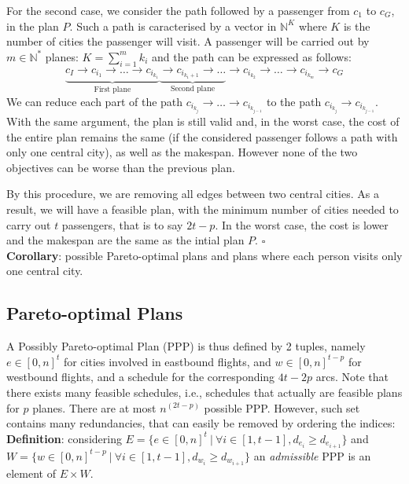 \documentclass{llncs}
\begin{document}
For the second case, we consider the path followed by a passenger from $c_1$ to $c_G$, in the plan $P$. Such a path is caracterised by a vector in $\mathbb{N}^{K}$ where $K$ is the number of cities the passenger will visit. A passenger will be carried out by $m \in \mathbb{N}^*$ planes: $K = \sum_{i=1}^m k_i$ and the path can be expressed as follows: 
$$\underbrace{c_I \to c_{i_{1}} \to \ldots \to c_{i_{k_1}}}_{\text{First plane}} \underbrace{\to c_{i_{k_1 + 1}} \to \ldots}_{\text{Second plane}} \to c_{i_{k_2}} \to \ldots \to c_{i_{k_m}} \to c_G$$
We can reduce each part of the path $c_{i_{k_j}} \to \ldots \to c_{i_{k_{j-1}}}$ to the path $c_{i_{k_j}} \to c_{i_{k_{j-1}}}$. With the same argument, the plan is still valid and, in the worst case, the cost of the entire plan remains the same (if the considered passenger follows a path with only one central city), as well as the makespan. However none of the two objectives can be worse than the previous plan.

By this procedure, we are removing all edges between two central cities. As a result, we will have a feasible plan, with the minimum number of cities needed to carry out $t$ passengers, that is to say $2t-p$. In the worst case, the cost is lower and the makespan are the same as the intial plan $P$. $\square$\\

\noindent
{\bf Corollary}: possible Pareto-optimal plans and plans where each person visits only one central city.

\subsection{Pareto-optimal Plans}
A Possibly Pareto-optimal Plan (PPP) is thus defined by 2 tuples, namely $e \in [0,n]^t$ for cities involved in eastbound flights, and $w \in [0,n]^{t-p}$ for westbound flights, and a schedule for the corresponding $4t-2p$ arcs. Note that there exists many feasible schedules, i.e., schedules that actually are feasible plans for $p$ planes. There are at most $n^{(2t-p)}$ possible PPP. However, such set contains many redundancies, that can easily be removed by ordering the indices:\\

\noindent
{\bf Definition}: considering $E = \{e \in [0,n]^t ~|~ \forall i \in [1,t-1], d_{e_i} \geq d_{e_{i+1}}\}$ and $W = \{w \in [0,n]^{t-p} ~|~ \forall i \in [1,t-1],  d_{w_i} \geq d_{w_{i+1}}\}$ an {\it admissible} PPP is an element of $E \times W$.\\
\end{document}

